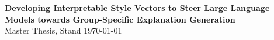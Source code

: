 \documentclass[a4paper]{article}
\begin{document}
\begin{center}
	\huge \textbf{Developing Interpretable Style Vectors to Steer Large Language Models towards Group-Specific Explanation Generation}\\[8pt]
	\Large Master Thesis, Stand \today \\[10pt]
\end{center}
\thispagestyle{firstpagestyle}
\tableofcontents



\end{document}
